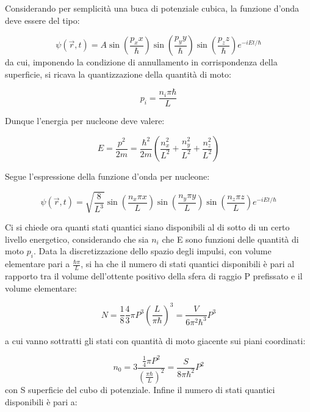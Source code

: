 \documentclass{article}
\begin{document}
Considerando per semplicità una buca di potenziale cubica, la funzione d'onda deve essere del tipo:

\begin{equation}
    \psi(\vec{r},t)= A\sin(\frac{p_x x}{\hbar})\sin(\frac{p_y y}{\hbar})\sin(\frac{p_z z}{\hbar})e^{-iEt/\hbar}
\end{equation}
da cui, imponendo la condizione di annullamento in corrispondenza della superficie, si ricava la quantizzazione della quantità di moto:

\begin{equation}
    p_i=\frac{n_i\pi\hbar}{L}
\end{equation}

Dunque l'energia per nucleone deve valere:

\begin{equation}
    E=\frac{p^2}{2m}=\frac{\hbar^2}{2m}(\frac{n_x^2}{L^2}+\frac{n_y^2}{L^2}+\frac{n_z^2}{L^2})
\end{equation}

Segue l'espressione della funzione d'onda per nucleone:

\begin{equation}
    \psi(\vec{r},t)=\sqrt{\frac{8}{L^3}}\sin(\frac{n_x\pi x}{L})\sin(\frac{n_y\pi y}{L})\sin(\frac{n_z\pi z}{L})e^{-iEt/\hbar}
\end{equation}

Ci si chiede ora quanti stati quantici siano disponibili al di sotto di un certo livello energetico, considerando che sia $n_i$ che E sono funzioni delle quantità di moto $p_i$.
Data la discretizzazione dello spazio degli impulsi, con volume elementare pari a $\frac{\hbar \pi}{L}$, si ha che il numero di stati quantici disponibili è pari al rapporto
tra il volume dell'ottente positivo della sfera di raggio P prefissato e il volume elementare:

\begin{equation}
    N=\frac{1}{8}\frac{4}{3}\pi P^3(\frac{L}{\pi\hbar})^3=\frac{V}{6\pi^2 \hbar^3}P^3
\end{equation}

a cui vanno sottratti gli stati con quantità di moto giacente sui piani coordinati:

\begin{equation}
    n_0= 3\frac{\frac{1}{4}\pi P^2}{(\frac{\pi \hbar}{L})^2}= \frac{S}{8\pi\hbar^2}P^2
\end{equation}
con S superficie del cubo di potenziale.
Infine il numero di stati quantici disponibili è pari a:
\end{document}
